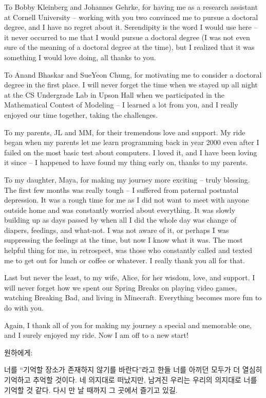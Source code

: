 To Bobby Kleinberg and Johannes Gehrke, for having me as a research assistant at Cornell University -- working with you two convinced me to pursue a doctoral degree, and I have no regret about it. Serendipity is the word I would use here -- it never occurred to me that I would pursue a doctoral degree (I was not even sure of the meaning of a doctoral degree at the time), but I realized that it was something I would love doing, all thanks to you. 

To Anand Bhaskar and SueYeon Chung, for motivating me to consider a doctoral degree in the first place. I will never forget the time when we stayed up all night at the CS Undergrade Lab in Upson Hall when we participated in the Mathematical Contest of Modeling -- I learned a lot from you, and I really enjoyed our time together, taking the challenges.

To my parents, JL and MM, for their tremendous love and support. My ride began when my parents let me learn programming back in year 2000 even after I failed on the most basic test about computers. I loved it, and I have been loving it since -- I happened to have found my thing early on, thanks to my parents. 

To my daughter, Maya, for making my journey more exciting -- truly blessing. The first few months was really tough -- I suffered from paternal postnatal depression. It was a rough time for me as I did not want to meet with anyone outside home and was constantly worried about everything. It was slowly building up as days passed by when all I did the whole day was change of diapers, feedings, and what-not. I was not aware of it, or perhaps I was suppressing the feelings at the time, but now I know what it was. The most helpful thing for me, in retrospect, was those who constantly called and texted me to get out for lunch or coffee or whatever. I really thank you all for that.

Last but never the least, to my wife, Alice, for her wisdom, love, and support. I will never forget how we spent our Spring Breaks on playing video games, watching Breaking Bad, and living in Minecraft. Everything becomes more fun to do with you.

Again, I thank all of you for making my journey a special and memorable one, and I surely enjoyed my ride. Now I am off to a new start!


\vspace{5 em}

원하에게: 

너를 ``기억할 장소가 존재하지 않기를 바란다''라고 한들 너를 아끼던 모두가 더 열심히 기억하고 추억할 것이다. 네 의지대로 떠났지만, 남겨진 우리는 우리의 의지대로 너를 기억할 것 같다. 다시 만 날 때까지 그 곳에서 즐기고 있길.
